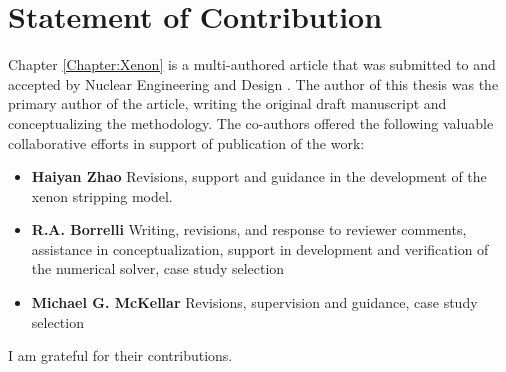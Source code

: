 \chapter{Statement of Contribution}
Chapter \ref{Chapter:Xenon} is a multi-authored article that was submitted to and accepted by Nuclear Engineering and Design \cite{RootXe}. The author of this thesis was the primary author of the article, writing the original draft manuscript and conceptualizing the methodology. The co-authors offered the following valuable collaborative efforts in support of publication of the work: 
\begin{itemize}
	\item \textbf{Haiyan Zhao} Revisions, support and guidance in the development of the xenon stripping model.
	\item \textbf{R.A. Borrelli} Writing, revisions, and response to reviewer comments, assistance in conceptualization, support in development and verification of the numerical solver, case study selection 
	\item \textbf{Michael G. McKellar} Revisions, supervision and guidance, case study selection
\end{itemize}

I am grateful for their contributions.